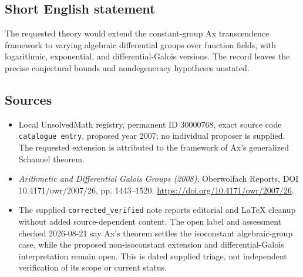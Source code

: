 \documentclass[11pt]{article}
\begin{document}
\subsection{Short English statement}
The requested theory would extend the constant-group Ax transcendence framework to varying algebraic differential groups over function fields, with logarithmic, exponential, and differential-Galois versions. The record leaves the precise conjectural bounds and nondegeneracy hypotheses unstated.
\subsection{Sources}
\begin{itemize}
\item Local UnsolvedMath registry, permanent ID \(30000768\), exact source code \texttt{catalogue entry}, proposed year 2007; no individual proposer is supplied. The requested extension is attributed to the framework of Ax's generalized Schanuel theorem.
\item \emph{Arithmetic and Differential Galois Groups (2008)}, Oberwolfach Reports, DOI 10.4171/owr/2007/26, pp. 1443--1520. \url{https://doi.org/10.4171/owr/2007/26}.
\item The supplied \texttt{corrected\_verified} note reports editorial and LaTeX cleanup without added source-dependent content. The open label and assessment checked 2026-08-21 say Ax's theorem settles the isoconstant algebraic-group case, while the proposed non-isoconstant extension and differential-Galois interpretation remain open. This is dated supplied triage, not independent verification of its scope or current status.
\end{itemize}
\end{document}
